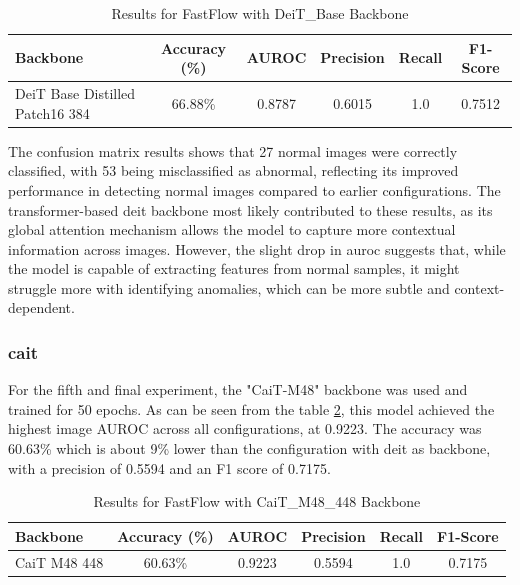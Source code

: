 \begin{table}[ht!]
    \centering
    \begin{tabular}{|l|c|c|c|c|c|}
        \hline
        \textbf{Backbone} & \textbf{Accuracy (\%)} & \textbf{AUROC} & \textbf{Precision} & \textbf{Recall} & \textbf{F1-Score} \\ \hline
        DeiT Base Distilled Patch16 384 & 66.88\% & 0.8787 & 0.6015 & 1.0 & 0.7512 \\ \hline
    \end{tabular}
    \caption{Results for FastFlow with DeiT\_Base Backbone}
    \label{tab:fastflow deit-base}
\end{table}

The confusion matrix results shows that 27 normal images were correctly classified, with 53 being misclassified as abnormal, reflecting its improved performance in detecting normal images compared to earlier configurations. The transformer-based \gls{deit} backbone most likely contributed to these results, as its global attention mechanism allows the model to capture more contextual information across images. However, the slight drop in \gls{auroc} suggests that, while the model is capable of extracting features from normal samples, it might struggle more with identifying anomalies, which can be more subtle and context-dependent.

\subsubsection*{\gls{cait}}

For the fifth and final experiment, the "CaiT-M48" backbone was used and trained for 50 epochs. As can be seen from the table \ref{tab:fastflow cait}, this model achieved the highest image AUROC across all configurations, at 0.9223. The accuracy was 60.63\% which is about 9\% lower than the configuration with \gls{deit} as backbone, with a precision of 0.5594 and an F1 score of 0.7175.

\begin{table}[ht!]
    \centering
    \begin{tabular}{|l|c|c|c|c|c|}
        \hline
        \textbf{Backbone} & \textbf{Accuracy (\%)} & \textbf{AUROC} & \textbf{Precision} & \textbf{Recall} & \textbf{F1-Score} \\ \hline
        CaiT M48 448 & 60.63\% & 0.9223 & 0.5594 & 1.0 & 0.7175 \\ \hline
    \end{tabular}
    \caption{Results for FastFlow with CaiT\_M48\_448 Backbone}
    \label{tab:fastflow cait}
\end{table}

